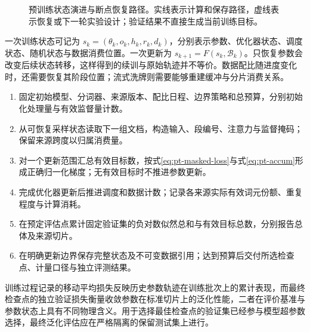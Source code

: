 \documentclass[../textbook.tex]{subfiles}
\begin{document}
\begin{figure}[htbp]
\centering
{}
\caption[预训练状态演进与断点恢复路径]{预训练状态演进与断点恢复路径。实线表示计算和保存路径，虚线表示恢复或下一轮实验设计；验证结果不直接生成当前训练目标。}\label{fig:pt-system}
\end{figure}

一次训练状态可记为 $s_k=(\theta_k,o_k,h_k,r_k,d_k)$，分别表示参数、优化器状态、调度状态、随机状态与数据消费位置。一次更新为 $s_{k+1}=F(s_k,\mathcal B_k)$。只恢复参数会改变后续状态转移，这样得到的续训与原始轨迹并不等价。数据配比随进度变化时，还需要恢复其阶段位置；流式洗牌则需要能够重建缓冲与分片消费关系。

\begin{algorithm}[按有效词元推进预训练]
\begin{enumerate}
\item 固定初始模型、分词器、来源版本、配比日程、边界策略和总预算，分别初始化处理量与有效监督量计数。
\item 从可恢复采样状态读取下一组文档，构造输入、段编号、注意力与监督掩码；保留来源跨度以归属消费量。
\item 对一个更新范围汇总有效目标数，按式\eqref{eq:pt-masked-loss}与式\eqref{eq:pt-accum}形成正确归一化梯度；无有效目标时不推进参数更新。
\item 完成优化器更新后推进调度和数据计数；记录各来源实际有效词元份额、重复程度与计算消耗。
\item 在预定评估点累计固定验证集的负对数似然总和与有效目标总数，分别报告总体及来源切片。
\item 在明确更新边界保存完整状态及不可变数据引用；达到预算后交付所选检查点、计量口径与独立评测结果。
\end{enumerate}
\end{algorithm}

训练过程记录的移动平均损失反映历史参数轨迹在训练批次上的累计表现，而最终检查点的独立验证损失衡量收敛参数在标准切片上的泛化性能，二者在评价基准与参数状态上具有不同物理含义。用于选择最佳检查点的验证集已经参与模型超参数选择，最终泛化评估应在严格隔离的保留测试集上进行。




\chapterreferences
\myendchapterdocument
\end{document}
